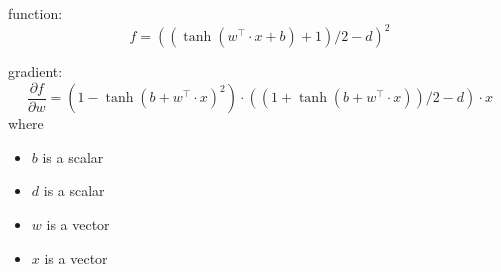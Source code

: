 \documentclass[12pt]{article}
\begin{document}
function:
\[
  f = ((\tanh(w^\top \cdot x+b)+1)/2-d)^{2}
\]

gradient:
\[
  \frac{\partial f}{\partial w} = (1-\tanh(b+w^\top \cdot x)^{2})\cdot ((1+\tanh(b+w^\top \cdot x))/2-d)\cdot x
\]
where
\begin{itemize}
  \item $b$ is a scalar
  \item $d$ is a scalar
  \item $w$ is a vector
  \item $x$ is a vector
\end{itemize}
\end{document}
